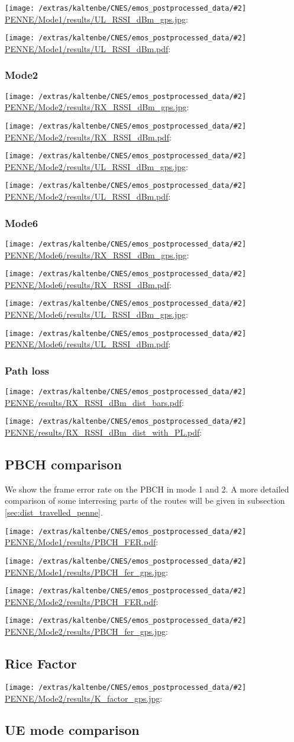 \documentclass[a4paper,10pt]{article}
\newcommand{\printfile}[2][]{
 \begin{minipage}{8cm}
  \centering
  \texttt{[image: /extras/kaltenbe/CNES/emos\_postprocessed\_data/\#2]}
  \url{#2}: #1

 \end{minipage}
}
\begin{document}
\printfile{PENNE/Mode1/results/UL_RSSI_dBm_gps.jpg}
\printfile{PENNE/Mode1/results/UL_RSSI_dBm.pdf}

\subsubsection{Mode2}

\printfile{PENNE/Mode2/results/RX_RSSI_dBm_gps.jpg}
\printfile{PENNE/Mode2/results/RX_RSSI_dBm.pdf}

\printfile{PENNE/Mode2/results/UL_RSSI_dBm_gps.jpg}
\printfile{PENNE/Mode2/results/UL_RSSI_dBm.pdf}

\subsubsection{Mode6}
\printfile{PENNE/Mode6/results/RX_RSSI_dBm_gps.jpg}
\printfile{PENNE/Mode6/results/RX_RSSI_dBm.pdf}

\printfile{PENNE/Mode6/results/UL_RSSI_dBm_gps.jpg}
\printfile{PENNE/Mode6/results/UL_RSSI_dBm.pdf}

\subsubsection{Path loss}

\printfile{PENNE/results/RX_RSSI_dBm_dist_bars.pdf}
\printfile{PENNE/results/RX_RSSI_dBm_dist_with_PL.pdf}


\subsection{PBCH comparison}
We show the frame error rate on the PBCH in mode 1 and 2. A more detailed comparison of some interresing parts of the routes will be given in subsection \ref{sec:dist_travelled_penne}.

\printfile{PENNE/Mode1/results/PBCH_FER.pdf}
\printfile{PENNE/Mode1/results/PBCH_fer_gps.jpg}

\printfile{PENNE/Mode2/results/PBCH_FER.pdf}
\printfile{PENNE/Mode2/results/PBCH_fer_gps.jpg}

\subsection{Rice Factor}

\printfile{PENNE/Mode2/results/K_factor_gps.jpg}

\subsection{UE mode comparison}
\end{document}
